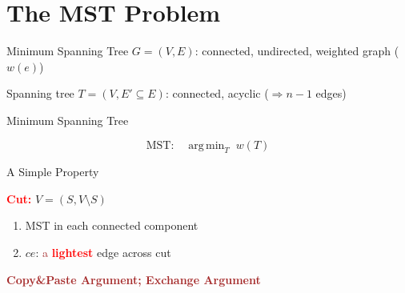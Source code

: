 \section{The MST Problem}	\label{section:mst-problem}

\begin{frame}{Minimum Spanning Tree}
  $G = (V, E)$: connected, undirected, weighted graph ($w(e)$)

  
  \pause
  \vspace{0.30cm}

  Spanning tree $T = (V, E' \subseteq E)$: connected, acyclic \pause ($\Rightarrow n-1$ edges)

  \vspace{0.20cm}
\end{frame}
\begin{frame}{Minimum Spanning Tree}

  \[
	\text{MST:} \quad \mathop{\mathrm{arg\,min}}_{T} \; w(T)
  \]

\end{frame}
\begin{frame}{A Simple Property}

  \begin{center}
	\textcolor{red}{\bf Cut:} $V = (S, V \setminus S)$
  \end{center}

  \pause

  \begin{enumerate}
	\item MST in each connected component
	\item $ce$: \textcolor{brown}{a} \textcolor{red}{\bf lightest} edge across cut
  \end{enumerate}

  \pause

  \begin{center}
	\textcolor{brown}{\bf Copy\&Paste Argument; Exchange Argument}
  \end{center}
\end{frame}
